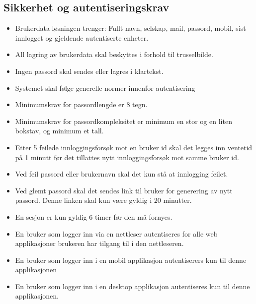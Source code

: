 \subsection{Sikkerhet og autentiseringskrav}
\label{subsec:kravspesifikasjonGammel_operasjonelleKrav_sikkerhet}

\begin{itemize}
\item Brukerdata løsningen trenger: Fullt navn, selskap, mail, passord, mobil, sist innlogget og gjeldende autentiserte enheter. 
\item All lagring av brukerdata skal beskyttes i forhold til trusselbilde. 
\item Ingen passord skal sendes eller lagres i klartekst.
\item Systemet skal følge generelle normer innenfor autentisering
\item Minimumskrav for passordlengde er 8 tegn.
\item Minimumskrav for passordkompleksitet er minimum en stor og en liten bokstav, og minimum et tall. 
\item Etter 5 feilede innloggingsforsøk mot en bruker id skal det legges inn ventetid på 1 minutt før det tillattes nytt innloggingsforsøk mot samme bruker id.
\item Ved feil passord eller brukernavn skal det kun stå at innlogging feilet. 
\item Ved glemt passord skal det sendes link til bruker for generering av nytt passord. Denne linken skal kun være gyldig i 20 minutter.
\item En sesjon er kun gyldig 6 timer før den må fornyes.
\item En bruker som logger inn via en nettleser  autentiseres for alle web applikasjoner brukeren har tilgang til i den nettleseren.
\item En bruker som logger inn i en mobil applikasjon autentiserers kun til denne applikasjonen
\item En bruker som logger inn i en desktop applikasjon autentiseres kun til denne applikasjonen.
\end{itemize}

